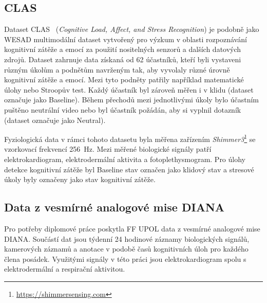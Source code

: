 \subsection{CLAS}
\label{subsec:clas}
Dataset CLAS~\cite{clasDataset} (\textit{Cognitive Load, Affect, and Stress
Recognition}) je podobně jako WESAD multimodální dataset vytvořený pro výzkum v
oblasti rozpoznávání kognitivní zátěže a emocí za použití nositelných senzorů a
dalších datových zdrojů. Dataset zahrnuje data získaná od 62 účastníků, kteří
byli vystaveni různým úkolům a podnětům navrženým tak, aby vyvolaly různé úrovně
kognitivní zátěže a emocí. Mezi tyto podněty patřily například matematické úlohy
nebo Stroopův test. Každý účastník byl zároveň měřen i v klidu (dataset označuje
jako Baseline). Během přechodů mezi jednotlivými úkoly bylo účastním puštěno
neutrální video nebo byl účastník požádán, aby si vyplnil dotazník (dataset
označuje jako Neutral). 

Fyziologická data v rámci tohoto datasetu byla měřena zařízením
\textit{Shimmer3}\footnote{\url{https://shimmersensing.com}} se vzorkovací
frekvencí 256~Hz. Mezi měřené biologické signály patří elektrokardiogram,
elektrodermální aktivita a fotoplethysmogram. Pro úlohy detekce kognitivní
zátěže byl Baseline stav označen jako klidový stav a stresové úkoly byly
označeny jako stav kognitivní zátěže. 

\subsection{Data z vesmírné analogové mise DIANA}
\label{subsec:data_diana}
Pro potřeby diplomové práce poskytla \gls{FF UPOL} data z vesmírné analogové
mise DIANA. Součástí dat jsou týdenní 24 hodinové záznamy biologických signálů,
kamerových záznamů a anotace v podobě časů kognitivních úloh pro každého člena
posádek. Využitými signály v této práci jsou elektrokardiogram spolu s
elektrodermální a respirační aktivitou.